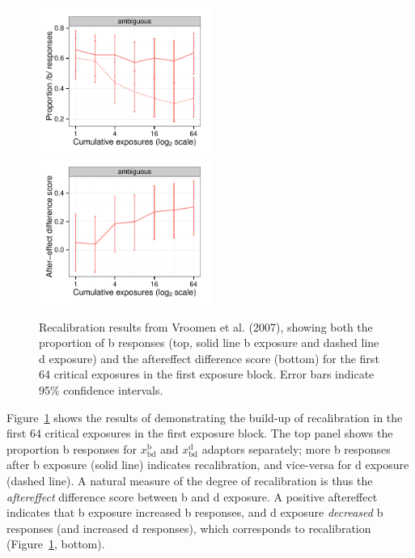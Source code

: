 \begin{figure}[htb]
  \centering
  \includegraphics[width=0.5\textwidth]{vroomen-bd-recal-first-64.pdf}
  \includegraphics[width=0.5\textwidth]{vroomen-ae-recal-first-64.pdf}
  \caption{Recalibration results from Vroomen et al. (2007), showing both the proportion of \ph b responses (top, solid line \ph b exposure and dashed line \ph d exposure) and the aftereffect difference score (bottom) for the first 64 critical exposures in the first exposure block. Error bars indicate 95\% confidence intervals.}
  \label{fig:vroomen-results-64-recal}
\end{figure}

Figure~\ref{fig:vroomen-results-64-recal} shows the results of \textcite{Vroomen2007} demonstrating the build-up of recalibration in the first 64 critical exposures in the first exposure block.  The top panel shows the proportion \ph b responses for $x_\mathrm{bd}^\mathrm{b}$ and $x_\mathrm{bd}^\mathrm{d}$ adaptors separately; more \ph b responses after \ph b exposure (solid line) indicates recalibration, and vice-versa for \ph d exposure (dashed line).  A natural measure of the degree of recalibration is thus the \emph{aftereffect} difference score between \ph b and \ph d exposure.  A positive aftereffect indicates that \ph b exposure increased \ph b responses, and \ph d exposure \emph{decreased} \ph b responses (and increased \ph d responses), which corresponds to recalibration (Figure~\ref{fig:vroomen-results-64-recal}, bottom).

